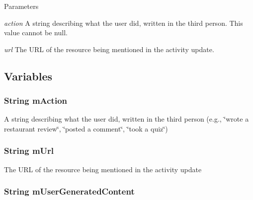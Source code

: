 \begin{DoxyParams}{Parameters}
\item[{\em action}]A string describing what the user did, written in the third person. This value cannot be {\ttfamily null}.\item[{\em url}]The URL of the resource being mentioned in the activity update. \end{DoxyParams}


\subsection{Variables}
\hypertarget{classcom_1_1janrain_1_1android_1_1engage_1_1types_1_1_j_r_activity_object_a23a0fef34f1a97a5566ae77ab6ee7d70}{
\subsubsection[{mAction}]{\setlength{\rightskip}{0pt plus 5cm}String {\bf mAction}}}
\label{classcom_1_1janrain_1_1android_1_1engage_1_1types_1_1_j_r_activity_object_a23a0fef34f1a97a5566ae77ab6ee7d70}
A string describing what the user did, written in the third person (e.g., \char`\"{}wrote a restaurant review\char`\"{}, \char`\"{}posted a comment\char`\"{}, \char`\"{}took a quiz\char`\"{}) \hypertarget{classcom_1_1janrain_1_1android_1_1engage_1_1types_1_1_j_r_activity_object_ab34fa6a32bb5e2724ccf38e29b8deedb}{
\subsubsection[{mUrl}]{\setlength{\rightskip}{0pt plus 5cm}String {\bf mUrl}}}
\label{classcom_1_1janrain_1_1android_1_1engage_1_1types_1_1_j_r_activity_object_ab34fa6a32bb5e2724ccf38e29b8deedb}
The URL of the resource being mentioned in the activity update \hypertarget{classcom_1_1janrain_1_1android_1_1engage_1_1types_1_1_j_r_activity_object_ae94df254bffa6663d441027d7d8275c0}{
\subsubsection[{mUserGeneratedContent}]{\setlength{\rightskip}{0pt plus 5cm}String {\bf mUserGeneratedContent}}}
